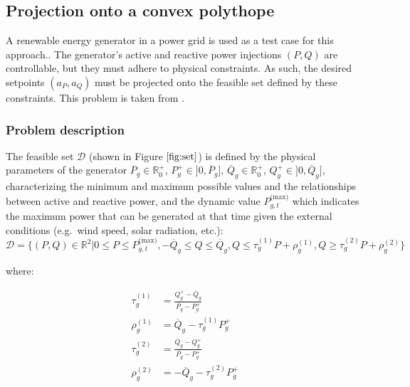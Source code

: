 \documentclass[
]{article}
\begin{document}
\subsection{Projection onto a convex
polythope}\label{projection-onto-a-convex-polythope}

A renewable energy generator in a power grid is used as a test case for
this approach.. The generator's active and reactive power injections
\((P,Q)\) are controllable, but they must adhere to physical
constraints. As such, the desired setpoints \((a_P, a_Q)\) must be
projected onto the feasible set defined by these constraints. This
problem is taken from \citep{henryGymANMReinforcementLearning2021}.

\subsubsection{Problem description}\label{problem-description-2}

The feasible set \(\mathcal{D}\) (shown in Figure \(\ref{fig:set}\)) is
defined by the physical parameters of the generator
\(\overline{P}_g \in \mathbb{R}_0^+\),
\(P^+_g \in ]0, \overline{P}_g]\),
\(\overline{Q}_g \in \mathbb{R}_0^+\),
\(Q^+_g \in ]0, \overline{Q}_g]\), characterizing the minimum and
maximum possible values and the relationships between active and
reactive power, and the dynamic value \(P^{\textrm{(max)}}_{g,t}\) which
indicates the maximum power that can be generated at that time given the
external conditions (e.g.~wind speed, solar radiation, etc.):
\begin{equation}
\mathcal{D} = \{(P, Q) \in \mathbb{R}^2 | 0 \leq P \leq P^{\textrm{(max)}}_{g,t}, -\overline{Q}_g \leq Q \leq \overline{Q}_g, Q \leq \tau^{(1)}_g P + \rho_g^{(1)}, Q \geq \tau^{(2)}_g P + \rho_g^{(2)}\}
\end{equation}

where:

\begin{align}
    \tau^{(1)}_g &= \frac{Q_g^+ - \overline{Q}_g}{\overline{P_g} - P_g^+}\\
    \rho^{(1)}_g &= \overline{Q}_g - \tau^{(1)}_gP_g^+\\
    \tau^{(2)}_g &= \frac{\overline{Q}_g -Q_g^+ }{\overline{P_g} - P_g^+}\\
    \rho^{(2)}_g &= -\overline{Q}_g - \tau^{(2)}_gP_g^+  \\
\end{align}
\end{document}

